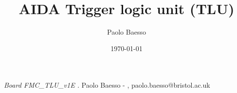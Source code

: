 \documentclass[10pt,twoside, fleqn]{memoir}
\author{Paolo Baesso}
\title{AIDA Trigger logic unit (TLU)}
\date{\today}
\makeatletter
\def\maketitle{%
  \null
  \thispagestyle{empty}%
  \vfill
  \begin{center}\leavevmode
    \normalfont
    {\LARGE\raggedleft \@author\par}%
    \hrulefill\par
    {\huge\raggedright \@title\par}%
    \vskip 1cm
  {\Large \@date\par}%
  \end{center}%
  \vfill
  \null
  \cleardoublepage
  }
\makeatother
\begin{document}
\def\brd{FMC\_TLU\_v1E }
\def\oldbrd{FMC\_TLU\_v1C }

\let\cleardoublepage\clearpage


\maketitle
\frontmatter

\null\vfill
\begin{flushleft}
\textit{Board \brd.}\newline
\newline
Paolo Baesso - \monthname,   \the\year\newline paolo.baesso@bristol.ac.uk
\bigskip

\end{flushleft}
\let\cleardoublepage\clearpage

\newpage
\tableofcontents

\mainmatter
\sloppy

\newenvironment{SpecialPar}
  {\begin{shaded}\noindent}
  {\end{shaded}}




%
















%


\printglossaries
\printglossary[type=\acronymtype,title=Abbreviations]

%
%
\end{document}
